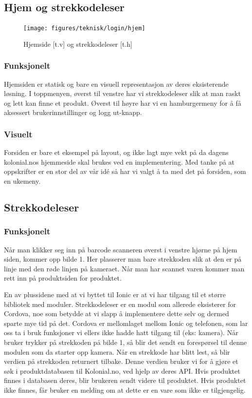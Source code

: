 \subsection{\textbf{Hjem og strekkodeleser}}
\begin{figure}[H]
    \texttt{[image: figures/teknisk/login/hjem]}
    \caption[Hjem]{Hjemside [t.v] og strekkodeleser [t.h]
    \label{fig:hjem}}
\end{figure}

\subsubsection{\textbf{Funksjonelt}}
Hjemsiden er statisk og bare en visuell representasjon av deres eksisterende løsning.
I toppmenyen, øverst til venstre har vi strekkodeleser slik at man raskt og lett kan finne et produkt. Øverst til høyre har vi en hamburgermeny for å få aksessert brukerinnstillinger og logg ut-knapp.

\subsubsection{\textbf{Visuelt}}
Forsiden er bare et eksempel på layout, og ikke lagt mye vekt på da dagens kolonial.nos hjemmeside skal brukes ved en implementering. Med tanke på at oppskrifter er en stor del av vår idé så har vi valgt å ta med det på forsiden, som en ukemeny.

\subsection{\textbf{Strekkodeleser}}
\subsubsection{\textbf{Funksjonelt}}
Når man klikker seg inn på barcode scanneren øverst i venstre hjørne på hjem siden, kommer opp bilde 1. Her plasserer man bare strekkoden slik at den er på linje med den røde linjen på kameraet. Når man har scannet varen kommer man rett inn på produktsiden for produktet. 

En av plussidene med at vi byttet til Ionic er at vi har tilgang til et større bibliotek med moduler. Strekkodeleser er en modul som allerede eksisterer for Cordova, noe som betydde at vi slapp å implementere dette selv og dermed sparte mye tid på det. Cordova er mellomlaget mellom Ionic og telefonen, som lar oss ta i bruk funksjoner vi ellers ikke hadde hatt tilgang til (eks: kamera). Når bruker trykker på strekkoden på bilde 1, så blir det sendt en forespørsel til denne modulen som da starter opp kamera. Når en strekkode har blitt lest, så blir verdien på strekkoden returnert tilbake. Denne verdien bruker vi for å gjøre et søk i produktdatabasen til Kolonial.no, ved hjelp av deres API. Hvis produktet finnes i databasen deres, blir brukeren sendt videre til produktet. Hvis produktet ikke finnes, får bruker en melding om at dette er en vare som ikke er tilgjengelig.

